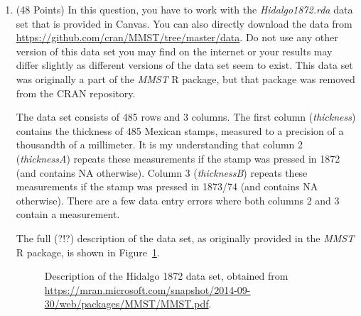 \documentclass[12pt,letterpaper,final]{article}
\begin{document}
\begin{enumerate}

\item (48 Points)
In this question, you have to work with the {\it Hidalgo1872.rda} data set
that is provided in Canvas. You can also directly download the data from 
\url{https://github.com/cran/MMST/tree/master/data}.
Do not use any other version of this data set you may find on the
internet
or your results may differ slightly as different versions
of the data set seem to exist. This data set was
originally a part of the {\it MMST} R package, but that
package was removed from the CRAN repository. 

The data set consists of 485 rows and 3 columns. The first column
({\it thickness}) contains the thickness of 485 Mexican stamps,
measured to a precision of a thousandth of a millimeter.
It is my understanding that 
column 2 ({\it thicknessA}) repeats these measurements if the stamp was pressed in 1872
(and contains NA otherwise). 
Column 3 ({\it thicknessB}) repeats these measurements if the stamp was pressed in 1873/74
(and contains NA otherwise). 
There are a few data entry errors where both columns 2 and 3 contain 
a measurement.

The full (?!?) description of the data set, as originally provided
in the {\it MMST} R package, is shown in Figure~\ref{Hidalgo1872}.


\begin{figure}[ht]
\caption{\label{Hidalgo1872}
Description of the Hidalgo 1872 data set, obtained from 
\url{https://mran.microsoft.com/snapshot/2014-09-30/web/packages/MMST/MMST.pdf}.
}
\end{figure}


\end{enumerate}
\end{document}

